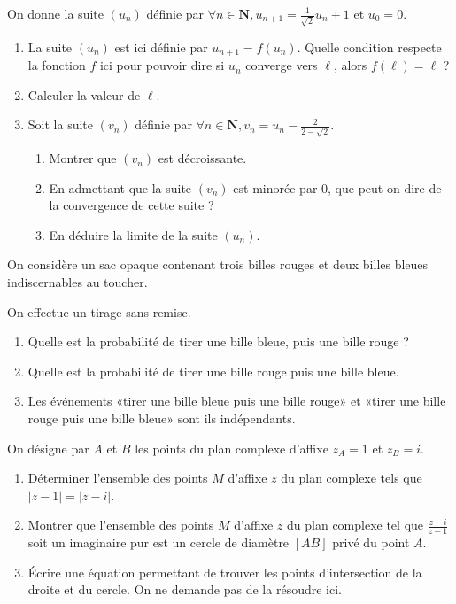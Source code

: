 \begin{question}[topic=suites]
  On donne la suite $(u_n)$ définie par $\forall n\in \mathbf{N},
  u_{n+1} = \frac{1}{\sqrt{2}}u_{n} + 1$ et $u_0 = 0$.
  \begin{enumerate}
    \item La suite $(u_n)$ est ici définie par $u_{n+1} = f(u_n)$. Quelle
      condition respecte la fonction $f$ ici pour pouvoir dire si $u_n$
      converge vers $\ell$, alors $f(\ell) = \ell$ ?
    \item Calculer la valeur de $\ell$.
    \item Soit la suite $(v_n)$ définie par $\forall n\in \mathbf{N}, v_n
      = u_n - \frac{2}{2 - \sqrt{2}}$.
      \begin{enumerate}
        \item Montrer que $(v_n)$ est décroissante.
        \item En admettant que la suite $(v_n)$ est minorée par 0, que
          peut-on dire de la convergence de cette suite ?
        \item En déduire la limite de la suite $(u_n)$.
      \end{enumerate}
  \end{enumerate}
\end{question}

\begin{question}[topic=probabilités]
  On considère un sac opaque contenant trois billes rouges et deux billes
  bleues indiscernables au toucher.

  On effectue un tirage sans remise.

  \begin{enumerate}
    \item Quelle est la probabilité de tirer une bille bleue, puis une
      bille rouge ?
    \item Quelle est la probabilité de tirer une bille rouge puis une
      bille bleue.
    \item Les événements «tirer une bille bleue puis une bille rouge» et
      «tirer une bille rouge puis une bille bleue» sont ils indépendants.
  \end{enumerate}
\end{question}

\begin{question}[topic=complexes]
  On désigne par $A$ et $B$ les points du plan complexe d'affixe $z_A = 1$
  et $z_B = i$.
  \begin{enumerate}
    \item Déterminer l'ensemble des points $M$ d'affixe $z$ du plan
      complexe tels que $\left\lvert z - 1 \right\rvert = \left\lvert z -
      i \right\rvert$.
    \item Montrer que l'ensemble des points $M$ d'affixe $z$ du plan
      complexe tel que $\frac{z - i}{z -1}$ soit un imaginaire pur est un
      cercle de diamètre $[AB]$ privé du point $A$.
    \item Écrire une équation permettant de trouver les points
      d'intersection de la droite et du cercle. On ne demande pas de la
      résoudre ici.
  \end{enumerate}
\end{question}


